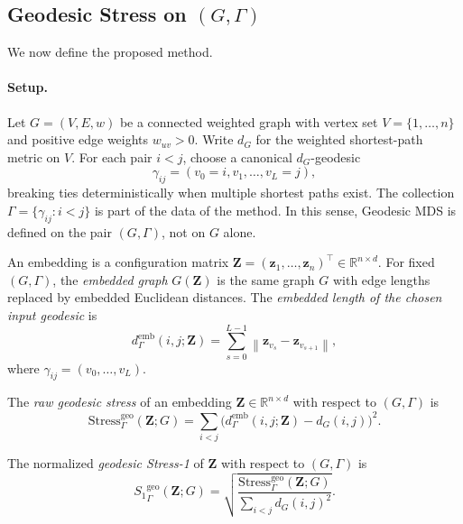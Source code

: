 \documentclass[twoside,11pt]{article}
\newcommand{\R}{\mathbb{R}}
\newcommand{\bz}{\mathbf{z}}
\newcommand{\bZ}{\mathbf{Z}}
\newcommand{\norm}[1]{\left\|#1\right\|}
\newcommand{\demb}{d^{\mathrm{emb}}}
\newcommand{\Stress}{\mathrm{Stress}}
\newcommand{\StressOne}{S_1}
\begin{document}
\subsection{Geodesic Stress on $(G,\Gamma)$}
\label{sec:geodesic_stress}

We now define the proposed method.

\paragraph{Setup.}
Let $G = (V,E,w)$ be a connected weighted graph with vertex set
$V = \{1,\ldots,n\}$ and positive edge weights $w_{uv} > 0$.  Write
$d_G$ for the weighted shortest-path metric on $V$.  For each pair
$i < j$, choose a canonical $d_G$-geodesic
\begin{equation}
  \gamma_{ij} = (v_0 = i, v_1, \ldots, v_L = j),
  \label{eq:canonical_geodesic}
\end{equation}
breaking ties deterministically when multiple shortest paths exist.  The
collection $\Gamma = \{\gamma_{ij} : i < j\}$ is part of the data of the
method.  In this sense, Geodesic MDS is defined on the pair $(G,\Gamma)$,
not on $G$ alone.

An embedding is a configuration matrix $\bZ = (\bz_1, \ldots, \bz_n)^\top
\in \R^{n \times d}$.  For fixed $(G,\Gamma)$, the \emph{embedded graph}
$G(\bZ)$ is the same graph $G$ with edge lengths replaced by embedded
Euclidean distances.  The \emph{embedded length of the chosen input
geodesic} is
\begin{equation}
  \demb_{\Gamma}(i,j;\bZ)
  = \sum_{s=0}^{L-1} \norm{\bz_{v_s} - \bz_{v_{s+1}}},
  \label{eq:emb_geodesic}
\end{equation}
where $\gamma_{ij} = (v_0, \ldots, v_L)$.

\begin{definition}
  \label{def:raw_geodesic_stress}
  The \emph{raw geodesic stress} of an embedding $\bZ \in \R^{n \times d}$
  with respect to $(G,\Gamma)$ is
  \begin{equation}
    \Stress^{\mathrm{geo}}_{\Gamma}(\bZ; G)
    = \sum_{i < j}
      \bigl(\demb_{\Gamma}(i,j;\bZ) - d_G(i,j)\bigr)^2.
    \label{eq:raw_geo_stress}
  \end{equation}
\end{definition}

\begin{definition}
  \label{def:geodesic_stress}
  The normalized \emph{geodesic Stress-1} of $\bZ$ with respect to
  $(G,\Gamma)$ is
  \begin{equation}
    {\StressOne}_{\Gamma}^{\mathrm{geo}}(\bZ; G)
    = \sqrt{
        \frac{\Stress^{\mathrm{geo}}_{\Gamma}(\bZ; G)}
             {\displaystyle\sum_{i < j} d_G(i,j)^2}
      }.
    \label{eq:geo_stress}
  \end{equation}
\end{definition}
\end{document}
